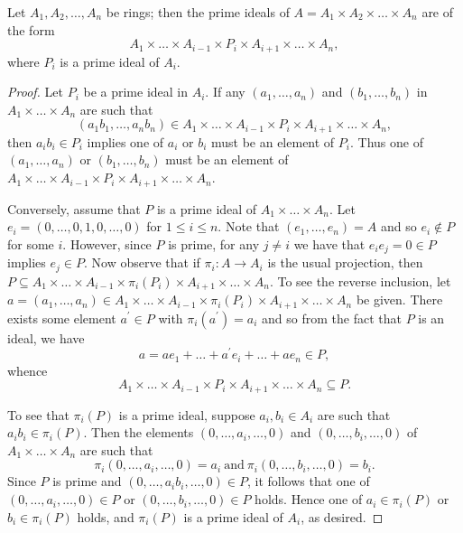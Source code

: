 \documentclass[10pt]{amsart}
\begin{document}
\begin{thm}
  Let $A_1, A_2, \ldots, A_n$ be rings; then the prime ideals of $A = A_1 \times A_2 \times \ldots \times A_n$ are of the form
  $$A_1 \times \ldots \times A_{i-1} \times P_i \times A_{i+1} \times \ldots \times A_n,$$
  where $P_i$ is a prime ideal of $A_i$.

  \begin{proof}
    Let $P_i$ be a prime ideal in $A_i$.
    If any $(a_1, \ldots, a_n)$ and $(b_1, \ldots, b_n)$ in $A_1 \times \ldots \times A_n$ are such that
    $$(a_1b_1, \ldots, a_nb_n) \in A_1 \times \ldots \times A_{i-1} \times P_i \times A_{i+1} \times \ldots \times A_n,$$
    then $a_ib_i \in P_i$ implies one of $a_i$ or $b_i$ must be an element of $P_i$.
    Thus one of $(a_1, \ldots, a_n)$ or $(b_1, \ldots, b_n)$ must be an element of $A_1 \times \ldots \times A_{i-1} \times P_i \times A_{i+1} \times \ldots \times A_n$.
    
    Conversely, assume that $P$ is a prime ideal of $A_1 \times \ldots \times A_n$.
    Let $e_i = (0, \ldots, 0, 1, 0, \ldots, 0)$ for $1 \leq i \leq n$.
    Note that $(e_1, \ldots, e_n) = A$ and so $e_i \not \in P$ for some $i$.
    However, since $P$ is prime, for any $j \neq i$ we have that $e_ie_j = 0 \in P$ implies $e_j \in P$.
    Now observe that if $\pi_i : A \rightarrow A_i$ is the usual projection, then $P \subseteq A_1 \times \ldots \times A_{i-1} \times \pi_i(P_i) \times A_{i+1} \times \ldots \times A_n$.
    To see the reverse inclusion, let $a = (a_1, \ldots, a_n) \in A_1 \times \ldots \times A_{i-1} \times \pi_i(P_i) \times A_{i+1} \times \ldots \times A_n$ be given.
    There exists some element $a^\prime \in P$ with $\pi_i(a^\prime) = a_i$ and so from the fact that $P$ is an ideal, we have
    $$a = ae_1 + \ldots + a^\prime e_i + \ldots + a e_n \in P,$$
    whence 
    $$A_1 \times \ldots \times A_{i-1} \times P_i \times A_{i+1} \times \ldots \times A_n \subseteq P.$$
    
    To see that $\pi_i(P)$ is a prime ideal, suppose $a_i, b_i \in A_i$ are such that $a_ib_i \in \pi_i(P)$.
    Then the elements $(0, \ldots, a_i, \ldots, 0)$ and $(0, \ldots, b_i, \ldots, 0)$ of $A_1 \times \ldots \times A_n$ are such that
    $$\pi_i(0, \ldots, a_i, \ldots, 0) = a_i\ \text{and}\ \pi_i(0, \ldots, b_i, \ldots, 0) = b_i.$$
    Since $P$ is prime and $(0, \ldots, a_ib_i, \ldots, 0) \in P$, it follows that one of $(0, \ldots, a_i, \ldots, 0) \in P$ or $(0, \ldots, b_i, \ldots, 0) \in P$ holds.
    Hence one of $a_i \in \pi_i(P)$ or $b_i \in \pi_i(P)$ holds, and $\pi_i(P)$ is a prime ideal of $A_i$, as desired.
  \end{proof}
\end{thm}
\end{document}
